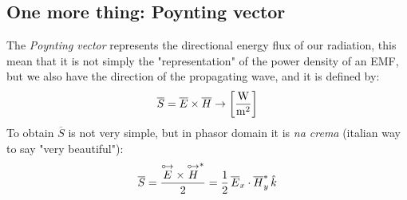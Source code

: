 \subsection*{One more thing: Poynting vector}
The \emph{Poynting vector} represents the directional energy flux of our radiation, this mean that it is not simply the "representation" of the power density of an EMF, but we also have the direction of the propagating wave, and it is defined by:
\begin{equation}\label{eq:poynting}
    \overline{S}=\overline{E}\times\overline{H}\rightarrow\left[\si{\frac{\watt}{\metre^2}}\right]
\end{equation}
To obtain $\overline{S}$ is not very simple, but in phasor domain it is \emph{na crema} (italian way to say "very beautiful"):
\begin{equation}
    \overline{S}=\frac{\overset{\mathbin {{\circ \mkern-2.5mu\rightarrow}}}{E}\times\overset{\mathbin {{\circ \mkern-2.5mu\rightarrow}}}{H}^*}{2}=\frac{1}{2}\,\overline{E}
_x\cdot\overline{H}_y^*\,\hat{\mathnormal{k}}
\end{equation}